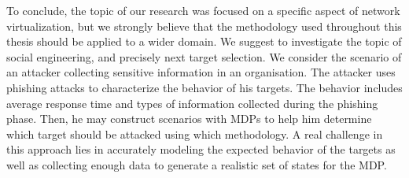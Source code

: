 To conclude, the topic of our research was focused on a specific aspect of network virtualization, but we strongly believe that the methodology used throughout this thesis should be applied to a wider domain. We suggest to investigate the topic of social engineering, and precisely next target selection. We consider the scenario of an attacker collecting sensitive information in an organisation. The attacker uses phishing attacks to characterize the behavior of his targets. The behavior includes average response time and types of information collected during the phishing phase. Then, he may construct scenarios with MDPs to help him determine which target should be attacked using which methodology.
A real challenge in this approach lies in accurately modeling the expected behavior of the targets as well as collecting enough data to generate a realistic set of states for the MDP.